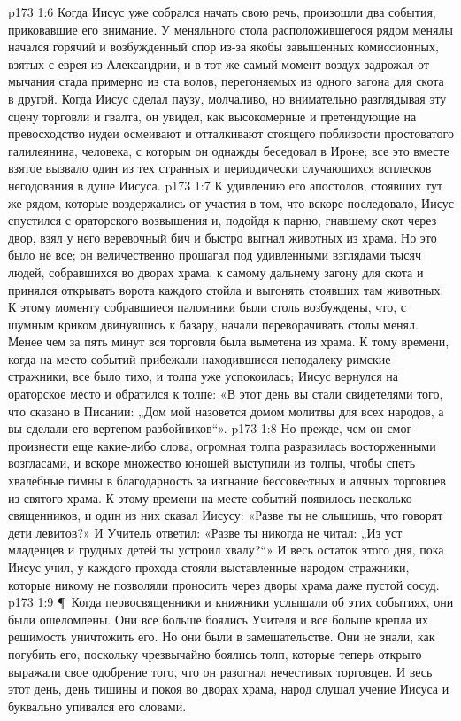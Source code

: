 \vs p173 1:6 Когда Иисус уже собрался начать свою речь, произошли два события, приковавшие его внимание. У меняльного стола расположившегося рядом менялы начался горячий и возбужденный спор из\hyp{}за якобы завышенных комиссионных, взятых с еврея из Александрии, и в тот же самый момент воздух задрожал от мычания стада примерно из ста волов, перегоняемых из одного загона для скота в другой. Когда Иисус сделал паузу, молчаливо, но внимательно разглядывая эту сцену торговли и гвалта, он увидел, как высокомерные и претендующие на превосходство иудеи осмеивают и отталкивают стоящего поблизости простоватого галилеянина, человека, с которым он однажды беседовал в Ироне; все это вместе взятое вызвало один из тех странных и периодически случающихся всплесков негодования в душе Иисуса.
\vs p173 1:7 К удивлению его апостолов, стоявших тут же рядом, которые воздержались от участия в том, что вскоре последовало, Иисус спустился с ораторского возвышения и, подойдя к парню, гнавшему скот через двор, взял у него веревочный бич и быстро выгнал животных из храма. Но это было не все; он величественно прошагал под удивленными взглядами тысяч людей, собравшихся во дворах храма, к самому дальнему загону для скота и принялся открывать ворота каждого стойла и выгонять стоявших там животных. К этому моменту собравшиеся паломники были столь возбуждены, что, с шумным криком двинувшись к базару, начали переворачивать столы менял. Менее чем за пять минут вся торговля была выметена из храма. К тому времени, когда на место событий прибежали находившиеся неподалеку римские стражники, все было тихо, и толпа уже успокоилась; Иисус вернулся на ораторское место и обратился к толпе: «В этот день вы стали свидетелями того, что сказано в Писании: „Дом мой назовется домом молитвы для всех народов, а вы сделали его вертепом разбойников“».
\vs p173 1:8 Но прежде, чем он смог произнести еще какие\hyp{}либо слова, огромная толпа разразилась восторженными возгласами, и вскоре множество юношей выступили из толпы, чтобы спеть хвалебные гимны в благодарность за изгнание бессовеcтных и алчных торговцев из святого храма. К этому времени на месте событий появилось несколько священников, и один из них сказал Иисусу: «Разве ты не слышишь, что говорят дети левитов?» И Учитель ответил: «Разве ты никогда не читал: „Из уст младенцев и грудных детей ты устроил хвалу?“» И весь остаток этого дня, пока Иисус учил, у каждого прохода стояли выставленные народом стражники, которые никому не позволяли проносить через дворы храма даже пустой сосуд.
\vs p173 1:9 \P\ Когда первосвященники и книжники услышали об этих событиях, они были ошеломлены. Они все больше боялись Учителя и все больше крепла их решимость уничтожить его. Но они были в замешательстве. Они не знали, как погубить его, поскольку чрезвычайно боялись толп, которые теперь открыто выражали свое одобрение того, что он разогнал нечестивых торговцев. И весь этот день, день тишины и покоя во дворах храма, народ слушал учение Иисуса и буквально упивался его словами.
